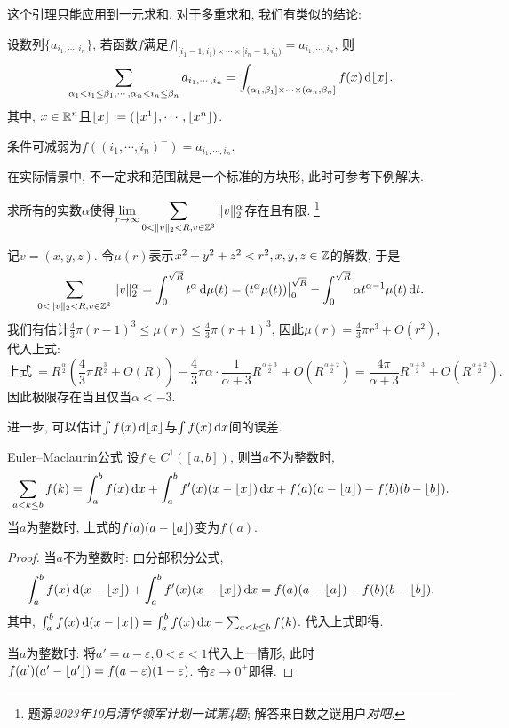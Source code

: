 这个引理只能应用到一元求和. 对于多重求和, 我们有类似的结论: 

\begin{lemma}{}
	设数列$\{ a_{i_1,\cdots ,i_n} \}$, 若函数$f$满足$f|_{[i_1-1,i_1) \times \cdots \times [i_n-1,i_n)}=a_{i_1,\cdots ,i_n}$, 则$$\sum_{\alpha _1 < i_1 \leq \beta _1 ,\cdots ,\alpha _n< i_n \leq \beta _n} a_{i_1,\cdots ,i_n} = \int_{(\alpha _1,\beta _1]\times \cdots \times (\alpha _n,\beta _n]} f(x) \mathop{}\!\mathrm{d} \lfloor x \rfloor.$$
	其中, $x \in \mathbb{R} ^n$且$\lfloor x \rfloor:=(\lfloor x^1 \rfloor,\cdots ,\lfloor x^n \rfloor)$. 
\end{lemma}
\begin{remark}
	条件可减弱为$f((i_1,\cdots ,i_n)^-)=a_{i_1,\cdots ,i_n}$. 
\end{remark}

在实际情景中, 不一定求和范围就是一个标准的方块形, 此时可参考下例解决. 

\begin{example}
	求所有的实数$\alpha$使得$\displaystyle \lim_{r \to \infty} \sum_{0<\| v \|_2 < R ,v \in \mathbb{Z} ^3} \| v \|_2 ^{\alpha}$存在且有限. \footnote{题源\textit{2023年10月清华领军计划一试第4题}; 解答来自数之谜用户\textit{对吧}. }
\end{example}
\begin{solution}
	记$v=(x,y,z)$. 令$\mu (r)$表示$x^2+y^2+z^2<r^2,x,y,z \in \mathbb{Z}$的解数, 于是$$\sum_{0<\| v \|_2 < R ,v \in \mathbb{Z} ^3} \| v \|_2 ^{\alpha} = \int_0^{\sqrt{R}} t^{\alpha} \mathop{}\!\mathrm{d} \mu (t) = (t^{\alpha} \mu (t))\big|_0^{\sqrt{R}} - \int_0^{\sqrt{R}} \alpha t^{\alpha -1} \mu (t) \mathop{}\!\mathrm{d} t.$$
	我们有估计$\frac{4}{3}\pi (r-1)^3 \leq \mu (r) \leq \frac{4}{3}\pi (r+1)^3$, 因此$\mu (r) = \frac{4}{3}\pi r^3+O(r^2)$, 代入上式: $$\textit{上式}~= R^{\frac{\alpha}{2}}\left( \frac{4}{3}\pi R^{\frac{3}{2}}+O(R) \right) - \frac{4}{3}\pi \alpha \cdot \frac{1}{\alpha +3} R^{\frac{\alpha +3}{2}} + O(R^{\frac{\alpha +2}{2}}) = \frac{4\pi}{\alpha +3} R^{\frac{\alpha +3}{2}} + O(R^{\frac{\alpha +2}{2}}).$$
	因此极限存在当且仅当$\alpha <-3$. 
\end{solution}

进一步, 可以估计$\int f(x) \mathop{}\!\mathrm{d} \lfloor x \rfloor$与$\int f(x) \mathop{}\!\mathrm{d} x$间的误差. 

\begin{proposition}{Euler–Maclaurin公式}
	设$f \in C^1([a,b])$, 则当$a$不为整数时, $$\sum_{a<k \leq b} f(k) = \int_a^b f(x) \mathop{}\!\mathrm{d} x + \int_a^b f'(x)(x-\lfloor x \rfloor) \mathop{}\!\mathrm{d} x + f(a)(a-\lfloor a \rfloor)-f(b)(b-\lfloor b \rfloor).$$
	当$a$为整数时, 上式的$f(a)(a-\lfloor a \rfloor)$变为$f(a)$. 
\end{proposition}
\begin{proof}
	当$a$不为整数时: 由分部积分公式, $$\int_a^b f(x) \mathop{}\!\mathrm{d} (x-\lfloor x \rfloor) + \int_a^b f'(x)(x-\lfloor x \rfloor) \mathop{}\!\mathrm{d} x = f(a)(a-\lfloor a \rfloor)-f(b)(b-\lfloor b \rfloor).$$
	其中, $\int_a^b f(x) \mathop{}\!\mathrm{d} (x-\lfloor x \rfloor) = \int_a^b f(x) \mathop{}\!\mathrm{d} x - \sum_{a<k \leq b}f(k)$. 代入上式即得. 
	
	当$a$为整数时: 将$a'=a-\varepsilon ,0<\varepsilon <1$代入上一情形, 此时$f(a')(a'-\lfloor a' \rfloor) = f(a-\varepsilon)(1-\varepsilon)$. 令$\varepsilon \to 0^+$即得. 
\end{proof}

